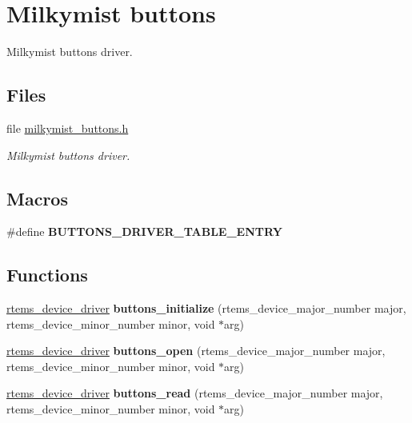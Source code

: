 \hypertarget{group__lm32__milkymist__buttons}{}\section{Milkymist buttons}
\label{group__lm32__milkymist__buttons}


Milkymist buttons driver.  


\subsection*{Files}
\begin{DoxyCompactItemize}
\item 
file \mbox{\hyperlink{milkymist__buttons_8h}{milkymist\+\_\+buttons.\+h}}
\begin{DoxyCompactList}\small\item\em Milkymist buttons driver. \end{DoxyCompactList}\end{DoxyCompactItemize}
\subsection*{Macros}
\begin{DoxyCompactItemize}
\item 
\#define {\bfseries B\+U\+T\+T\+O\+N\+S\+\_\+\+D\+R\+I\+V\+E\+R\+\_\+\+T\+A\+B\+L\+E\+\_\+\+E\+N\+T\+RY}
\end{DoxyCompactItemize}
\subsection*{Functions}
\begin{DoxyCompactItemize}
\item 
\mbox{\label{group__lm32__milkymist__buttons_gae87272abdde4198e011006dd5e1daaae}} 
\mbox{\hyperlink{group__ClassicStatus_ga545d41846817eaba6143d52ee4d9e9fe}{rtems\+\_\+device\+\_\+driver}} {\bfseries buttons\+\_\+initialize} (rtems\+\_\+device\+\_\+major\+\_\+number major, rtems\+\_\+device\+\_\+minor\+\_\+number minor, void $\ast$arg)
\item 
\mbox{\label{group__lm32__milkymist__buttons_gac27d7a278f92f461a9e6e5381e7e741f}} 
\mbox{\hyperlink{group__ClassicStatus_ga545d41846817eaba6143d52ee4d9e9fe}{rtems\+\_\+device\+\_\+driver}} {\bfseries buttons\+\_\+open} (rtems\+\_\+device\+\_\+major\+\_\+number major, rtems\+\_\+device\+\_\+minor\+\_\+number minor, void $\ast$arg)
\item 
\mbox{\label{group__lm32__milkymist__buttons_gaaf2b8b0635f84d3250b4835cccc1f5b6}} 
\mbox{\hyperlink{group__ClassicStatus_ga545d41846817eaba6143d52ee4d9e9fe}{rtems\+\_\+device\+\_\+driver}} {\bfseries buttons\+\_\+read} (rtems\+\_\+device\+\_\+major\+\_\+number major, rtems\+\_\+device\+\_\+minor\+\_\+number minor, void $\ast$arg)
\end{DoxyCompactItemize}


